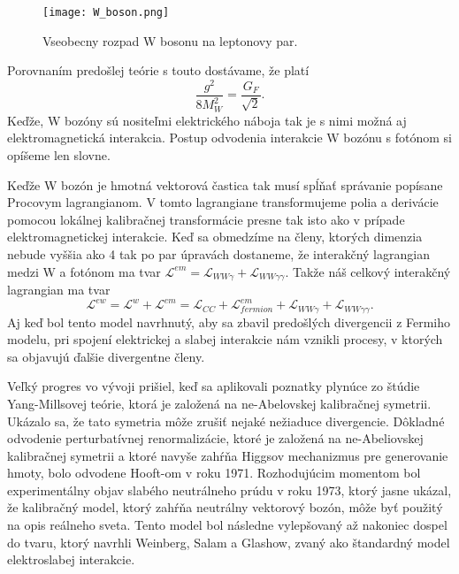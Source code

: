 \documentclass[../../main.tex]{subfiles}
\begin{document}
\begin{figure}[!h]
\centering
\texttt{[image: W\_boson.png]}
\caption{Vseobecny rozpad W bosonu na leptonovy par.}
\label{sf1:fig:W_boson}
\end{figure}
\newline
Porovnaním predošlej teórie s touto dostávame, že platí
\begin{equation}
\frac{g^2}{8M_W^2}=\frac{G_F}{\sqrt{2}}.
\end{equation}
Keďže, W bozóny sú nositeľmi elektrického náboja tak je s nimi možná aj elektromagnetická interakcia. Postup odvodenia interakcie W bozónu s fotónom si opíšeme len slovne.

Keďže W bozón je hmotná vektorová častica tak musí spĺňať správanie popísane Procovym lagrangianom. V tomto lagrangiane transformujeme polia a derivácie pomocou lokálnej kalibračnej transformácie presne tak isto ako v prípade elektromagnetickej interakcie. Keď sa obmedzíme na členy, ktorých dimenzia nebude vyššia ako 4 tak po par úpravách dostaneme, že interakčný lagrangian medzi W a fotónom ma tvar $\mathcal{L}^{em}=\mathcal{L}_{WW\gamma}+\mathcal{L}_{WW\gamma \gamma}$. Takže náš celkový interakčný lagrangian ma tvar
$$
\mathcal{L}^{ew}=\mathcal{L}^{w}+\mathcal{L}^{em} =\mathcal{L}_{CC}+\mathcal{L}^{em}_{fermion}+\mathcal{L}_{WW\gamma}+\mathcal{L}_{WW\gamma\gamma}.
$$
Aj keď bol tento model navrhnutý, aby sa zbavil predošlých divergencii z Fermiho modelu, pri spojení elektrickej a slabej interakcie nám vznikli procesy, v ktorých sa objavujú ďalšie divergentne členy.
 
Veľký progres vo vývoji prišiel, keď sa aplikovali poznatky plynúce zo štúdie Yang-Millsovej teórie, ktorá je založená na ne-Abelovskej kalibračnej symetrii. Ukázalo sa, že tato symetria môže zrušiť nejaké nežiaduce divergencie. Dôkladné odvodenie perturbatívnej renormalizácie, ktoré je založená na ne-Abeliovskej kalibračnej symetrii a ktoré navyše zahŕňa Higgsov mechanizmus pre generovanie hmoty, bolo odvodene Hooft-om v roku 1971. Rozhodujúcim momentom bol experimentálny objav slabého neutrálneho prúdu v roku 1973, ktorý jasne ukázal, že kalibračný model, ktorý zahŕňa neutrálny vektorový bozón, môže byť použitý na opis reálneho sveta. Tento model bol následne vylepšovaný až nakoniec dospel do tvaru, ktorý navrhli Weinberg, Salam a Glashow, zvaný ako štandardný model elektroslabej interakcie.
\end{document}
